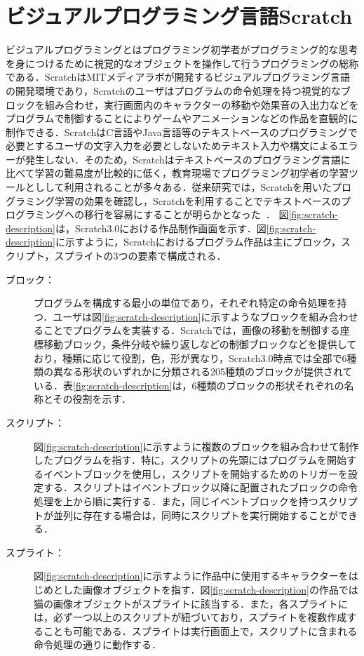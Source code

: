 \documentclass[11pt,dvipdfmx]{jreport}
\begin{document}
\section{ビジュアルプログラミング言語Scratch}
ビジュアルプログラミングとはプログラミング初学者がプログラミング的な思考を身につけるために視覚的なオブジェクトを操作して行うプログラミングの総称である．ScratchはMITメディアラボが開発するビジュアルプログラミング言語の開発環境であり，Scratchのユーザはプログラムの命令処理を持つ視覚的なブロックを組み合わせ，実行画面内のキャラクターの移動や効果音の入出力などをプログラムで制御することによりゲームやアニメーションなどの作品を直観的に制作できる．ScratchはC言語やJava言語等のテキストベースのプログラミングで必要とするユーザの文字入力を必要としないためテキスト入力や構文によるエラーが発生しない．そのため，Scratchはテキストベースのプログラミング言語に比べて学習の難易度が比較的に低く，教育現場でプログラミング初学者の学習ツールとしして利用されることが多々ある．従来研究では，Scratchを用いたプログラミング学習の効果を確認し，Scratchを利用することでテキストベースのプログラミングへの移行を容易にすることが明らかとなった~\cite{Weintrop_2017}．
図\ref{fig:scratch-description}は，Scratch3.0における作品制作画面を示す．図\ref{fig:scratch-description}に示すように，Scratchにおけるプログラム作品は主にブロック，スクリプト，スプライトの3つの要素で構成される．
\begin{description}
\item [ブロック：]プログラムを構成する最小の単位であり，それぞれ特定の命令処理を持つ．ユーザは図\ref{fig:scratch-description}に示すようなブロックを組み合わせることでプログラムを実装する．Scratchでは，画像の移動を制御する座標移動ブロック，条件分岐や繰り返しなどの制御ブロックなどを提供しており，種類に応じて役割，色，形が異なり，Scratch3.0時点では全部で6種類の異なる形状のいずれかに分類される205種類のブロックが提供されている．表\ref{fig:scratch-description}は，6種類のブロックの形状それぞれの名称とその役割を示す．
\item [スクリプト：]図\ref{fig:scratch-description}に示すように複数のブロックを組み合わせて制作したプログラムを指す．特に，スクリプトの先頭にはプログラムを開始するイベントブロックを使用し，スクリプトを開始するためのトリガーを設定する．スクリプトはイベントブロック以降に配置されたブロックの命令処理を上から順に実行する．また，同じイベントブロックを持つスクリプトが並列に存在する場合は，同時にスクリプトを実行開始することができる．
\item [スプライト：]図\ref{fig:scratch-description}に示すように作品中に使用するキャラクターをはじめとした画像オブジェクトを指す．図\ref{fig:scratch-description}の作品では猫の画像オブジェクトがスプライトに該当する．また，各スプライトには，必ず一つ以上のスクリプトが紐づいており，スプライトを複数作成することも可能である．スプライトは実行画面上で，スクリプトに含まれる命令処理の通りに動作する．
\end{description}
\end{document}
